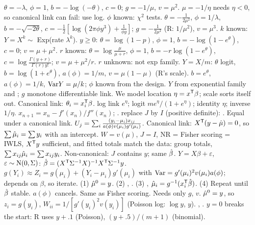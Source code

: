 \li{} $\theta=-\lambda$, $\phi=1$, $b=-\log(-\theta)$, $c=0$; $g=-1/\mu$, $v=\mu^2$. $\mu=-1/\eta$ needs $\eta<0$, so canonical link can fail: use log. $\phi$ known: $\chi^2$ tests.
\li{} $\theta=-\frac1{2\mu^2}$, $\phi=1/\lambda$, $b=-\sqrt{-2\theta}$, $c=-\frac12[\log(2\pi\phi y^3)+\frac1{\phi y}]$; $g=-\frac1{2\mu^2}$ (R: $1/\mu^2$), $v=\mu^3$.
\li{} $k$ known: $Y=X^k\sim$ Exp(rate $\lambda^k$).
\li{} $y\ge0$: $\theta=\log(1-p)$, $\phi=1$, $b=-\log(1-e^\theta)$, $c=0$; $v=\mu+\mu^2$.
\li{} $r$ known: $\theta=\log\frac\mu{\mu+r}$, $\phi=1$, $b=-r\log(1-e^\theta)$, $c=\log\frac{\Gamma(y+r)}{\Gamma(r)y!}$; $v=\mu+\mu^2/r$. $r$ unknown: not exp family.
\li{} $Y=X/m$: $\theta$ logit, $b=\log(1+e^\theta)$, $a(\phi)=1/m$, $v=\mu(1-\mu)$ (R's scale).  $b=e^\theta$, $a(\phi)=1/k$, $\mathrm{Var} Y=\mu/k$; $\phi$ known from the design.
\bx
{} $Y$ from exponential family and ; $g$ monotone differentiable link. We model location $\eta=x^{\mathsf T}\beta$; scale sorts itself out. Canonical link: $\theta_i=x_i^{\mathsf T}\beta$.
\sk{} log link $e^\eta$; logit $me^\eta/(1+e^\eta)$; identity $\eta$; inverse $1/\eta$.
\sk{} $x_{n+1}=x_n-f'(x_n)/f''(x_n)$; .  replace $J$ by $I$ (positive definite): . Equal under a canonical link.
\sk{} $U_j=\sum_{i}\frac{(y_i-\mu_i)x_{ij}}{a(\phi)v(\mu_i)g'(\mu_i)}$. Canonical link: $X^{\mathsf T}(y-\hat{\mu})=0$, so $\sum\hat{\mu}_i=\sum y_i$ with an intercept.
\sk{} $W=v(\mu)$, $J=I$, NR = Fisher scoring = IWLS, $X^{\mathsf T} y$ sufficient, and fitted totals match the data: group totals, $\sum x_{ij}\hat{\mu}_i=\sum x_{ij}y_i$. Non-canonical: $J$ contains $y$; same $\hat{\beta}$.
\sk{} $Y=X\beta+\varepsilon$, $\varepsilon\sim\mathrm{N}(0,\Sigma)$: $\hat{\beta}=(X^{\mathsf T}\Sigma^{-1} X)^{-1} X^{\mathsf T}\Sigma^{-1} y$.  $g(Y_i)\approx Z_i=g(\mu_i)+(Y_i-\mu_i)g'(\mu_i)$ with $\mathrm{Var}=g'(\mu_i)^2v(\mu_i)a(\phi)$; depends on $\beta$, so iterate.
\sk{} (1) $\hat{\mu}^0=y$. (2) , . (3) , $\hat{\mu}_i=g^{-1}(x_i^{\mathsf T}\hat{\beta})$. (4) Repeat until $\hat{\beta}$ stable. $a(\phi)$ cancels. Same as Fisher scoring. Needs only $g$, $v$.
\sk{} $\hat{\mu}^0=y$, so $z_i=g(y_i)$, $W_{ii}=1/[g'(y_i)^2v(y_i)]$ (Poisson log: $\log y$, $y$). , . $y=0$ breaks the start: R uses $y+.1$ (Poisson), $(y+.5)/(m+1)$ (binomial).
